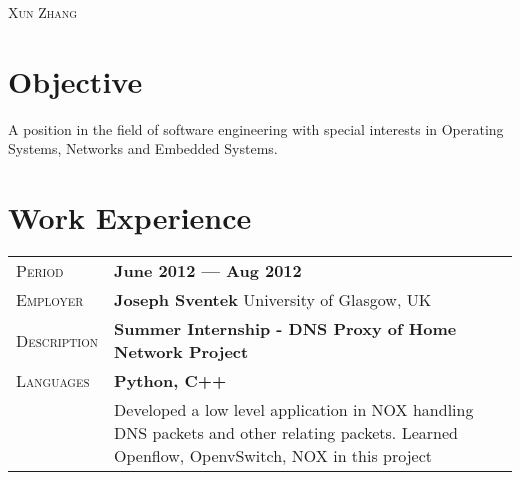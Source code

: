 \documentclass[a4paper, oneside, final]{scrartcl} %
\newcommand{\gray}{\rowcolor[gray]{.90}} %
\begin{document}
\begin{center} %


{\fontsize{36}{36}\selectfont\scshape Xun Zhang} %

\vspace{1cm} %


\section{Objective}

A position in the field of software engineering with special interests in Operating Systems, Networks and Embedded Systems.


\section{Work Experience}


\begin{tabularx}{0.97\linewidth}{>{\raggedleft\scshape}p{2cm}X}
\gray Period & \textbf{June 2012 --- Aug 2012}\\
\gray Employer & \textbf{Joseph Sventek} \hfill University of Glasgow, UK\\
\gray Description & \textbf{Summer Internship - DNS Proxy of Home Network Project}\\
\gray Languages & \textbf{Python, C++}\\
\ & Developed a low level application in NOX handling DNS packets and other relating packets.  Learned Openflow, OpenvSwitch, NOX in this project
\end{tabularx}



\end{center}
\end{document}
